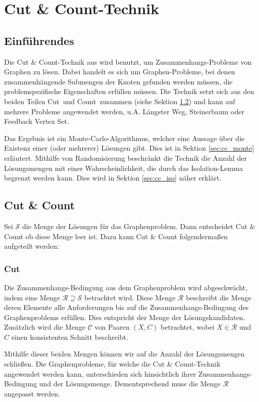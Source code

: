 \chapter{Cut \& Count-Technik}
\label{c:cc_general}

\section{Einführendes}
\label{sec:cc_intro}
Die Cut \& Count-Technik aus \cite{cygan_solving_2011} wird benutzt, um Zusammenhangs-Probleme von Graphen zu lösen.
Dabei handelt es sich um Graphen-Probleme, bei denen zusammenhängende Submengen der Knoten gefunden werden müssen, die problemspezifische  Eigenschaften erfüllen müssen. 
Die Technik setzt sich aus den beiden Teilen \glqq Cut\grqq ~und \glqq Count\grqq ~zusammen (siehe Sektion \ref{sec:cc_cc}) und kann auf mehrere Probleme angewendet werden, u.A. Längster Weg, Steinerbaum oder Feedback Vertex Set.

Das Ergebnis ist ein Monte-Carlo-Algorithmus, welcher eine Aussage über die Existenz einer (oder mehrerer) Lösungen gibt. Dies ist in Sektion \ref{sec:cc_monte} erläutert.
Mithilfe von Randomisierung beschränkt die Technik die Anzahl der Lösungsmengen mit einer Wahrscheinlichkeit, die durch das Isolation-Lemma begrenzt werden kann. Dies wird in Sektion \ref{sec:cc_iso} näher erklärt.


\section{Cut \& Count}
\label{sec:cc_cc}
Sei $\mathcal{S}$ die Menge der Lösungen für das Graphenproblem. 
Dann entscheidet Cut \& Count ob diese Menge leer ist. 
Dazu kann Cut \& Count folgendermaßen aufgeteilt werden:

\subsection{Cut}
\label{ssec:cc_cut}
Die Zusammenhangs-Bedingung aus dem Graphenproblem wird abgeschwächt, indem eine Menge $\mathcal{R} \supseteq \mathcal{S}$ betrachtet wird. 
Diese Menge $\mathcal{R}$ beschreibt die Menge deren Elemente alle Anforderungen bis auf die Zusammenhangs-Bedingung des Graphenproblems erfüllen. Dies entspricht der Menge der Lösungskandidaten.
Zusätzlich wird die Menge $\mathcal{C}$ von Paaren $(X,C)$ betrachtet, wobei $X \in \mathcal{R}$ und $C$ einen konsistenten Schnitt beschreibt. 

Mithilfe dieser beiden Mengen können wir auf die Anzahl der Lösungsmengen schließen. Die Graphenprobleme, für welche die Cut \& Count-Technik angewendet werden kann, unterschieden sich hinsichtlich ihrer Zusammenhangs-Bedingung und der Lösungsmenge.
Dementsprechend muss die Menge $\mathcal{R}$ angepasst werden.
